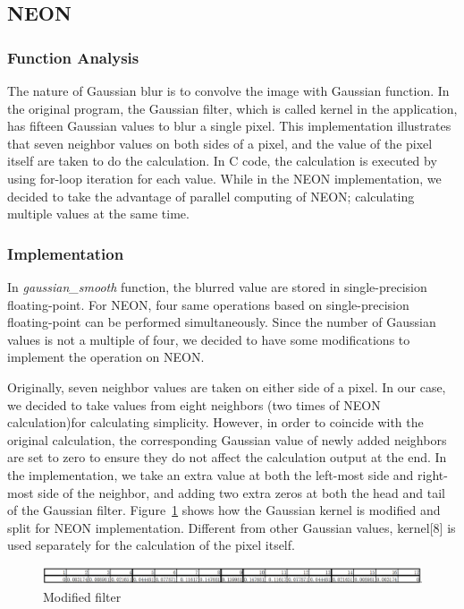 \subsection{NEON}
\subsubsection{Function Analysis}

The nature of Gaussian blur is to convolve the image with Gaussian function. In the original program, the Gaussian filter, which is called kernel in the application, has fifteen Gaussian values to blur a single pixel. This implementation illustrates that seven neighbor values on both sides of a pixel, and the value of the pixel itself are taken to do the calculation. In C code, the calculation is executed by using for-loop iteration for each value. While in the NEON implementation, we decided to take the advantage of parallel computing of NEON; calculating multiple values at the same time.

\subsubsection{Implementation}

In \textit{gaussian\_smooth} function, the blurred value are stored in single-precision floating-point. For NEON, four same operations based on single-precision floating-point can be performed simultaneously. Since the number of Gaussian values is not a multiple of four, we decided to have some modifications to implement the operation on NEON. 

Originally, seven neighbor values are taken on either side of a pixel. In our case, we decided to take values from eight neighbors (two times of NEON calculation)for calculating simplicity. However, in order to coincide with the original calculation, the corresponding Gaussian value of newly added neighbors are set to zero to ensure they do not affect the calculation output at the end. In the implementation, we take an extra value at both the left-most side and right-most side of the neighbor, and adding two extra zeros at both the head and tail of the Gaussian filter. Figure~\ref{fig:newfilter} shows how the Gaussian kernel is modified and split for NEON implementation. Different from other Gaussian values, kernel[8] is used separately for the calculation of the pixel itself. 

\begin{figure}
\centering
\includegraphics[width=\linewidth]{drawings/filter}
\caption{Modified filter}
\label{fig:newfilter}
\end{figure}


